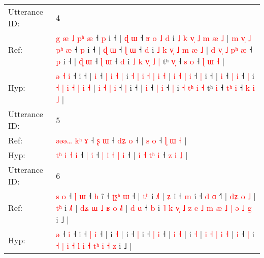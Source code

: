 \documentclass[10pt]{article}
\DeclareRobustCommand{\hl}[1]{{\textcolor{red}{#1}}}
\begin{document}
\begin{longtable}{ll}
 \\
\midrule
Utterance ID: & 4 \\
Ref: & \hl{g}\hl{ }\hl{æ}\hl{ }\hl{˩} \hl{p}\hl{ʰ} \hl{æ} ˧\hl{ }\hl{p} i ˧ |\hl{ }\hl{ɖ} \hl{ɯ} ˧ \hl{ʁ} \hl{o} \hl{˩} \hl{d} i \hl{˩} \hl{k} \hl{v}\hl{̩} \hl{˩} \hl{m} \hl{æ} \hl{˩} |\hl{ }\hl{m} \hl{v}\hl{̩} \hl{˩} \hl{p}\hl{ʰ} \hl{æ} ˧ \hl{p} i ˧ |\hl{ }\hl{ɖ} \hl{ɯ} ˧ \hl{ɭ} \hl{ɯ} ˧ \hl{d} i \hl{˩} \hl{k} \hl{v}\hl{̩} \hl{˩} \hl{m} \hl{æ} \hl{˩} |\hl{ }\hl{d} \hl{v}\hl{̩} \hl{˩} \hl{p}\hl{ʰ} \hl{æ} ˧ \hl{p} i ˧ |\hl{ }\hl{ɖ} \hl{ɯ} ˧ \hl{ɭ} \hl{ɯ} ˧ \hl{d} i\hl{ }\hl{˩} \hl{k} \hl{v}\hl{̩} \hl{˩} \hl{|} tʰ \hl{v}\hl{̩} ˧ \hl{}\hl{s} \hl{o} ˧ \hl{ɭ} \hl{ɯ} \hl{˧} |
 \\
Hyp: & \hl{}\hl{}\hl{}\hl{}\hl{ə} \hl{}\hl{˧} \hl{i} ˧\hl{}\hl{} i ˧ |\hl{}\hl{} \hl{i} ˧ \hl{|} \hl{i} \hl{˧} \hl{|} i \hl{˧} \hl{|} \hl{}\hl{i} \hl{˧} \hl{|} \hl{i} \hl{˧} |\hl{}\hl{} \hl{}\hl{i} \hl{˧} \hl{}\hl{|} \hl{i} ˧ \hl{|} i ˧ |\hl{}\hl{} \hl{i} ˧ \hl{|} \hl{i} ˧ \hl{|} i \hl{˧} \hl{|} \hl{}\hl{i} \hl{˧} \hl{|} \hl{i} \hl{˧} |\hl{}\hl{} \hl{}\hl{i} \hl{˧} \hl{}\hl{|} \hl{i} ˧ \hl{|} i ˧ |\hl{}\hl{} \hl{i} ˧ \hl{|} \hl{i} ˧ \hl{|} i\hl{}\hl{} \hl{˧} \hl{t}\hl{ʰ} \hl{i} \hl{˧} tʰ \hl{}\hl{i} ˧ \hl{t}\hl{ʰ} \hl{i} ˧ \hl{k} \hl{i} \hl{˩} |
 \\
\midrule
Utterance ID: & 5 \\
Ref: & \hl{ə}\hl{ə}\hl{ə}\hl{…} \hl{k}\hl{ʰ} \hl{ɤ} ˧ \hl{ʂ} \hl{ɯ} ˧\hl{}\hl{}\hl{}\hl{} \hl{}\hl{d}\hl{ʑ} \hl{o} ˧ |\hl{}\hl{}\hl{}\hl{} \hl{}\hl{s} \hl{o} ˧ \hl{ɭ} \hl{ɯ} \hl{˧} |
 \\
Hyp: & \hl{t}\hl{ʰ}\hl{ }\hl{i} \hl{}\hl{˧} \hl{i} ˧ \hl{|} \hl{i} ˧\hl{ }\hl{|}\hl{ }\hl{i} \hl{˧}\hl{ }\hl{|} \hl{i} ˧ |\hl{ }\hl{i}\hl{ }\hl{˧} \hl{t}\hl{ʰ} \hl{i} ˧ \hl{z} \hl{i} \hl{˩} |
 \\
\midrule
Utterance ID: & 6 \\
Ref: & \hl{s}\hl{ }\hl{o} ˧\hl{ }\hl{ɭ} \hl{ɯ} ˧\hl{ }\hl{h} i\hl{̃} ˧ \hl{ʈ}\hl{ʂ}\hl{ʰ} \hl{ɯ} ˧ |\hl{ }\hl{t}\hl{ʰ} i \hl{˩}\hl{˥} |\hl{ }\hl{ʑ} i ˧ \hl{m} i ˧ \hl{d} \hl{ɑ} ˧\hl{˥} |\hl{ }\hl{d}\hl{ʑ} \hl{o} \hl{˩} |\hl{ }\hl{t}\hl{ʰ} i \hl{˩}\hl{˥} |\hl{ }\hl{d}\hl{ʑ} \hl{ɯ} \hl{˩} \hl{ʁ} \hl{o} \hl{˩}\hl{˥} |\hl{ }\hl{d} \hl{ɑ} ˧ \hl{b} i\hl{ }\hl{˥}\hl{ }\hl{k} \hl{v}\hl{̩} \hl{˩} \hl{z} \hl{e} \hl{˩} \hl{m} \hl{æ} \hl{˩}\hl{ }\hl{|} \hl{ə} \hl{˩} \hl{g} i ˩ |
 \\
Hyp: & \hl{}\hl{}\hl{ə} ˧\hl{}\hl{} \hl{i} ˧\hl{}\hl{} i\hl{} ˧ \hl{}\hl{}\hl{|} \hl{i} ˧ |\hl{}\hl{}\hl{} i \hl{}\hl{˧} |\hl{}\hl{} i ˧ \hl{|} i ˧ \hl{|} \hl{i} ˧\hl{} |\hl{}\hl{}\hl{} \hl{i} \hl{˧} |\hl{}\hl{}\hl{} i \hl{}\hl{˧} |\hl{}\hl{}\hl{} \hl{i} \hl{˧} \hl{|} \hl{i} \hl{}\hl{˧} |\hl{}\hl{} \hl{i} ˧ \hl{|} i\hl{}\hl{}\hl{}\hl{} \hl{}\hl{˧} \hl{|} \hl{i} \hl{˧} \hl{l} \hl{i} \hl{˧} \hl{}\hl{t}\hl{ʰ} \hl{i} \hl{˧} \hl{z} i ˩ |

\end{longtable}
\end{document}
